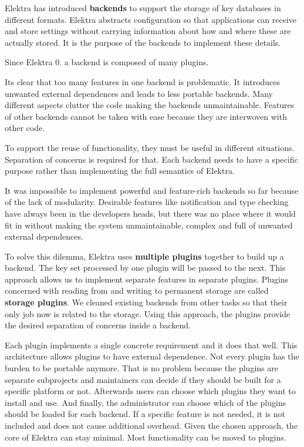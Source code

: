 Elektra has introduced {\bfseries backends} to support the storage of key databases in different formats. Elektra abstracts configuration so that applications can receive and store settings without carrying information about how and where these are actually stored. It is the purpose of the backends to implement these details.

Since Elektra 0. a backend is composed of many plugins.

It\textquotesingle{}s clear that too many features in one backend is problematic. It introduces unwanted external dependences and leads to less portable backends. Many different aspects clutter the code making the backends unmaintainable. Features of other backends cannot be taken with ease because they are interwoven with other code.

To support the reuse of functionality, they must be useful in different situations. Separation of concerns is required for that. Each backend needs to have a specific purpose rather than implementing the full semantics of Elektra.

It was impossible to implement powerful and feature-\/rich backends so far because of the lack of modularity. Desirable features like notification and type checking have always been in the developers\textquotesingle{} heads, but there was no place where it would fit in without making the system unmaintainable, complex and full of unwanted external dependences.

To solve this dilemma, Elektra uses {\bfseries multiple plugins} together to build up a backend. The key set processed by one plugin will be passed to the next. This approach allows us to implement separate features in separate plugins. Plugins concerned with reading from and writing to permanent storage are called {\bfseries storage plugins}. We cleaned existing backends from other tasks so that their only job now is related to the storage. Using this approach, the plugins provide the desired separation of concerns inside a backend.

Each plugin implements a single concrete requirement and it does that well. This architecture allows plugins to have external dependence. Not every plugin has the burden to be portable anymore. That is no problem because the plugins are separate subprojects and maintainers can decide if they should be built for a specific platform or not. Afterwards users can choose which plugins they want to install and use. And finally, the administrator can choose which of the plugins should be loaded for each backend. If a specific feature is not needed, it is not included and does not cause additional overhead. Given the chosen approach, the core of Elektra can stay minimal. Most functionality can be moved to plugins.

